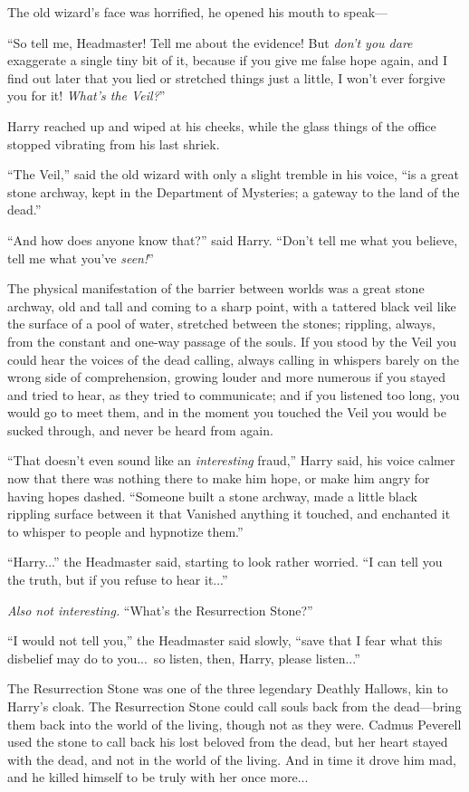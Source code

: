 The old wizard’s face was horrified, he opened his mouth to speak—

“So tell me, Headmaster! Tell me about the evidence! But \emph{don’t you dare} exaggerate a single tiny bit of it, because if you give me false hope again, and I find out later that you lied or stretched things just a little, I won’t ever forgive you for it! \emph{What’s the Veil?}”

Harry reached up and wiped at his cheeks, while the glass things of the office stopped vibrating from his last shriek.

“The Veil,” said the old wizard with only a slight tremble in his voice, “is a great stone archway, kept in the Department of Mysteries; a gateway to the land of the dead.”

“And how does anyone know that?” said Harry. “Don’t tell me what you believe, tell me what you’ve \emph{seen!}”

The physical manifestation of the barrier between worlds was a great stone archway, old and tall and coming to a sharp point, with a tattered black veil like the surface of a pool of water, stretched between the stones; rippling, always, from the constant and one-way passage of the souls. If you stood by the Veil you could hear the voices of the dead calling, always calling in whispers barely on the wrong side of comprehension, growing louder and more numerous if you stayed and tried to hear, as they tried to communicate; and if you listened too long, you would go to meet them, and in the moment you touched the Veil you would be sucked through, and never be heard from again.

“That doesn’t even sound like an \emph{interesting} fraud,” Harry said, his voice calmer now that there was nothing there to make him hope, or make him angry for having hopes dashed. “Someone built a stone archway, made a little black rippling surface between it that Vanished anything it touched, and enchanted it to whisper to people and hypnotize them.”

“Harry...” the Headmaster said, starting to look rather worried. “I can tell you the truth, but if you refuse to hear it...”

\emph{Also not interesting.} “What’s the Resurrection Stone?”

“I would not tell you,” the Headmaster said slowly, “save that I fear what this disbelief may do to you...\ so listen, then, Harry, please listen...”

The Resurrection Stone was one of the three legendary Deathly Hallows, kin to Harry’s cloak. The Resurrection Stone could call souls back from the dead—bring them back into the world of the living, though not as they were. Cadmus Peverell used the stone to call back his lost beloved from the dead, but her heart stayed with the dead, and not in the world of the living. And in time it drove him mad, and he killed himself to be truly with her once more...

